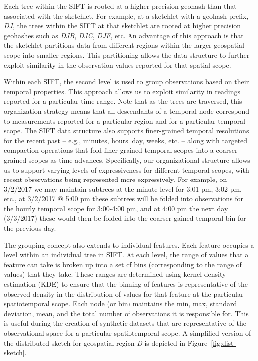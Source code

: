 Each tree within the SIFT is rooted at a higher precision geohash than that associated with the sketchlet. For example, at a sketchlet with a geohash prefix, \emph{DJ}, the trees within the SIFT at that sketchlet are rooted at higher precision geohashes such as \emph{DJB}, \emph{DJC}, \emph{DJF}, etc. An advantage of this approach is that the sketchlet partitions data from different regions within the larger geospatial scope into smaller regions. This partitioning allows the data structure to further exploit similarity in the observation values reported for that spatial scope. 

Within each SIFT, the second level is used to group observations based on their temporal properties. This approach allows us to exploit similarity in readings reported for a particular time range. Note that as the trees are traversed, this organization strategy means that all descendants of a temporal node correspond to measurements reported for a particular region and for a particular temporal scope. The SIFT data structure also supports finer-grained temporal resolutions for the recent past -- e.g., minutes, hours, day, weeks, etc. -- along with targeted compaction operations that fold finer-grained temporal scopes into a coarser grained scopes as time advances. Specifically, our organizational structure allows us to support varying levels of expressiveness for different temporal scopes, with recent observations being represented more expressively. For example, on 3/2/2017 we may maintain subtrees at the minute level for 3:01 pm, 3:02 pm, etc., at 3/2/2017 @ 5:00 pm these subtrees will be folded into observations for the hourly temporal scope for 3:00-4:00 pm, and at 4:00 pm the next day (3/3/2017) these would then be folded into the coarser gained temporal bin for the previous day. 

The grouping concept also extends to individual features. Each feature occupies a level within an individual tree in SIFT. At each level, the range of values that a feature can take is broken up into a set of bins (corresponding to the range of values) that they take. These ranges are determined using kernel density estimation (KDE) to ensure that the binning of features is representative of the observed density in the distribution of values for that feature at the particular spatiotemporal scope. Each node (or bin) maintains the min, max, standard deviation, mean, and the total number of observations it is responsible for.  This is useful during the creation of synthetic datasets that are representative of the observational space for a particular spatiotemporal scope. A simplified version of the distributed sketch for geospatial region \emph{D} is depicted in Figure~\ref{fig:dist-sketch}. 

